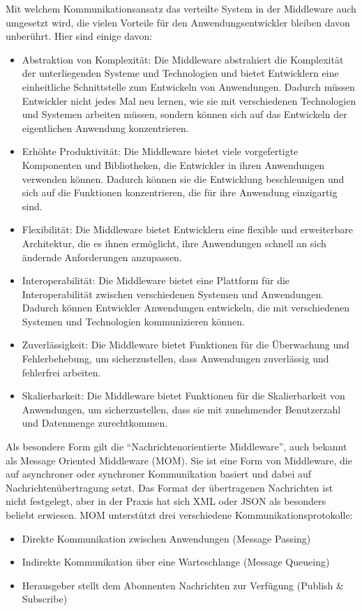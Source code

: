 Mit welchem Kommunikationsansatz das verteilte System in der Middleware auch umgesetzt wird, die vielen Vorteile für den Anwendungsentwickler bleiben davon unberührt. Hier sind einige davon:
\begin{itemize}
\item Abstraktion von Komplexität: Die Middleware abstrahiert die Komplexität der unterliegenden Systeme und Technologien und bietet Entwicklern eine einheitliche Schnittstelle zum Entwickeln von Anwendungen. Dadurch müssen Entwickler nicht jedes Mal neu lernen, wie sie mit verschiedenen Technologien und Systemen arbeiten müssen, sondern können sich auf das Entwickeln der eigentlichen Anwendung konzentrieren.

\item Erhöhte Produktivität: Die Middleware bietet viele vorgefertigte Komponenten und Bibliotheken, die Entwickler in ihren Anwendungen verwenden können. Dadurch können sie die Entwicklung beschleunigen und sich auf die Funktionen konzentrieren, die für ihre Anwendung einzigartig sind.

\item Flexibilität: Die Middleware bietet Entwicklern eine flexible und erweiterbare Architektur, die es ihnen ermöglicht, ihre Anwendungen schnell an sich ändernde Anforderungen anzupassen.

\item Interoperabilität: Die Middleware bietet eine Plattform für die Interoperabilität zwischen verschiedenen Systemen und Anwendungen. Dadurch können Entwickler Anwendungen entwickeln, die mit verschiedenen Systemen und Technologien kommunizieren können.

\item Zuverlässigkeit: Die Middleware bietet Funktionen für die Überwachung und Fehlerbehebung, um sicherzustellen, dass Anwendungen zuverlässig und fehlerfrei arbeiten.

\item Skalierbarkeit: Die Middleware bietet Funktionen für die Skalierbarkeit von Anwendungen, um sicherzustellen, dass sie mit zunehmender Benutzerzahl und Datenmenge zurechtkommen.
\end{itemize}
Als besondere Form gilt die \enquote{Nachrichtenorientierte Middleware}, auch bekannt als Message Oriented Middleware (MOM). Sie ist eine Form von Middleware, die auf asynchroner oder synchroner Kommunikation basiert und dabei auf Nachrichtenübertragung setzt. Das Format der übertragenen Nachrichten ist nicht festgelegt, aber in der Praxis hat sich XML oder JSON als besonders beliebt erwiesen. MOM unterstützt drei verschiedene Kommunikationsprotokolle:
\begin{itemize}
\item Direkte Kommunikation zwischen Anwendungen (Message Passing)
\item Indirekte Kommunikation über eine Warteschlange (Message Queueing)
\item Herausgeber stellt dem Abonnenten Nachrichten zur Verfügung (Publish \& Subscribe)
\end{itemize}

